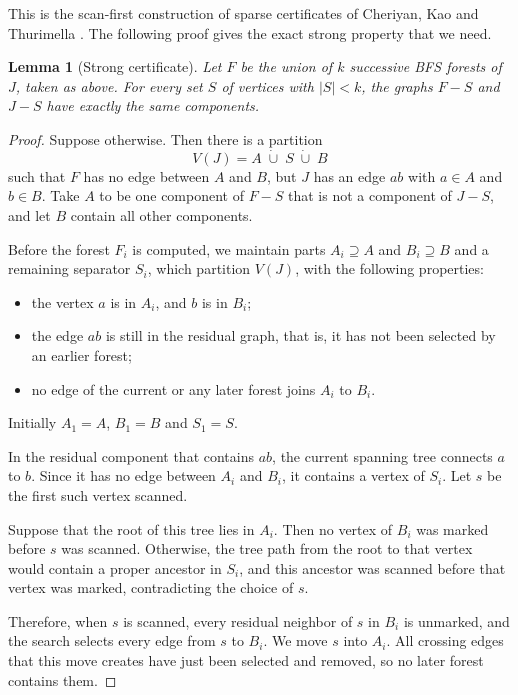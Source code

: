 \documentclass[11pt]{article}
\newtheorem{lemma}{Lemma}
\begin{document}
This is the scan-first construction of sparse certificates of Cheriyan, Kao and
Thurimella \cite{CKT93}. The following proof gives the exact strong property
that we need.

\begin{lemma}[Strong certificate]\label{lem:forests}
Let $F$ be the union of $k$ successive BFS forests of $J$, taken as above. For
every set $S$ of vertices with $|S|<k$, the graphs $F-S$ and $J-S$ have
exactly the same components.
\end{lemma}

\begin{proof}
Suppose otherwise. Then there is a partition
\begin{equation*}
V(J)=A\;\dot\cup\;S\;\dot\cup\;B
\end{equation*}
such that $F$ has no edge between $A$ and $B$, but $J$ has an edge $ab$ with
$a\in A$ and $b\in B$. Take $A$ to be one component of $F-S$ that is not a
component of $J-S$, and let $B$ contain all other components.

Before the forest $F_i$ is computed, we maintain parts $A_i\supseteq A$ and
$B_i\supseteq B$ and a remaining separator $S_i$, which partition $V(J)$, with
the following properties:
\begin{itemize}[nosep]
\item the vertex $a$ is in $A_i$, and $b$ is in $B_i$;
\item the edge $ab$ is still in the residual graph, that is, it has not been
selected by an earlier forest;
\item no edge of the current or any later forest joins $A_i$ to $B_i$.
\end{itemize}
Initially $A_1=A$, $B_1=B$ and $S_1=S$.

In the residual component that contains $ab$, the current spanning tree
connects $a$ to $b$. Since it has no edge between $A_i$ and $B_i$, it contains
a vertex of $S_i$. Let $s$ be the first such vertex scanned.

Suppose that the root of this tree lies in $A_i$. Then no vertex of $B_i$ was
marked before $s$ was scanned. Otherwise, the tree path from the root to that
vertex would contain a proper ancestor in $S_i$, and this ancestor was scanned
before that vertex was marked, contradicting the choice of $s$.

Therefore, when $s$ is scanned, every residual neighbor of $s$ in $B_i$ is
unmarked, and the search selects every edge from $s$ to $B_i$. We move $s$ into
$A_i$. All crossing edges that this move creates have just been selected and
removed, so no later forest contains them.


\end{proof}
\end{document}
